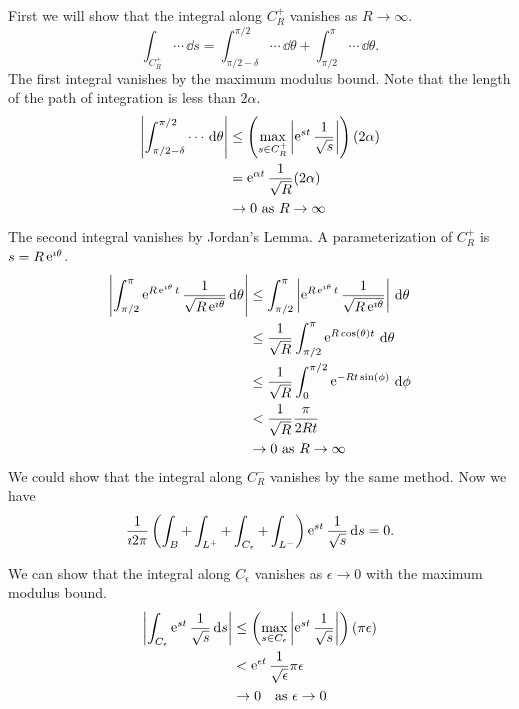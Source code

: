 \begin{Example}
  First we will show that the integral along
  $C_R^+$ vanishes as $R \to \infty$.
  \[
  \int_{C_R^+} \cdots \,\dd s = \int_{\pi/2-\delta}^{\pi/2} \cdots \,\dd \theta + \int_{\pi/2}^\pi \cdots \,\dd \theta.
  \]
  The first integral vanishes by the maximum modulus bound.  Note 
  that the length of the path of integration is less than $2 \alpha$.
  \begin{align*}
    \left| \int_{\pi/2-\delta}^{\pi/2} \cdots \,\mathrm{d} \theta \right|
    &\leq \left( \max_{s \in C_R^+} 
      \left| \mathop{\mathrm{e}}\nolimits^{s t} \frac{1}{\sqrt{s}} \right| \right) (2 \alpha) \\
    &= \mathop{\mathrm{e}}\nolimits^{\alpha t} \frac{1}{\sqrt{R}} (2 \alpha) \\
    &\to 0\ \mathrm{as}\ R \to \infty
  \end{align*}
  The second integral vanishes by Jordan's Lemma.
  A parameterization of $C_R^+$ is $s = R \mathop{\mathrm{e}}\nolimits^{\imath \theta}$.
  \begin{align*}
    \left| \int_{\pi/2}^{\pi} \mathop{\mathrm{e}}\nolimits^{R \mathop{\mathrm{e}}\nolimits^{\imath \theta} t} \frac{1}{\sqrt{R \mathop{\mathrm{e}}\nolimits^{\imath \theta}}} \,\mathrm{d} \theta \right|
    &\leq \int_{\pi/2}^{\pi} \left| \mathop{\mathrm{e}}\nolimits^{R \mathop{\mathrm{e}}\nolimits^{\imath \theta} t} \frac{1}{\sqrt{R \mathop{\mathrm{e}}\nolimits^{\imath \theta}}} \right| \,\mathrm{d} \theta \\
    &\leq \frac{1}{\sqrt{R}} \int_{\pi/2}^{\pi} \mathop{\mathrm{e}}\nolimits^{R \cos(\theta) t} \,\mathrm{d} \theta \\
    &\leq \frac{1}{\sqrt{R}} \int_0^{\pi/2} \mathop{\mathrm{e}}\nolimits^{- R t \sin(\phi)} \,\mathrm{d} \phi \\
    &< \frac{1}{\sqrt{R}} \frac{\pi}{2 R t} \\
    &\to 0\ \mathrm{as}\ R \to \infty
  \end{align*}
  We could show that the integral along $C_R^-$ vanishes by the same method.
  Now we have
  \[
  \frac{1}{\imath 2 \pi} \left( \int_B + \int_{L^+} + \int_{C_\epsilon} + \int_{L^-} \right)
  \mathop{\mathrm{e}}\nolimits^{s t} \frac{1}{\sqrt{s}}\,\mathrm{d} s = 0.
  \]



  We can show that the integral along $C_\epsilon$ vanishes as 
  $\epsilon \to 0$ with the maximum modulus bound.  
  \begin{align*} 
    \left| \int_{C_\epsilon} \mathop{\mathrm{e}}\nolimits^{s t} \frac{1}{\sqrt{s}} \,\mathrm{d} s \right|
    &\leq \left(\max_{s \in C_\epsilon} \left| \mathop{\mathrm{e}}\nolimits^{s t} \frac{1}{\sqrt{s}} 
      \right| \right) (\pi \epsilon) \\
    &< \mathop{\mathrm{e}}\nolimits^{\epsilon t} \frac{1}{\sqrt{\epsilon}} \pi \epsilon \\
    &\to 0 \quad \mathrm{as}\ \epsilon \to 0
  \end{align*}




\end{Example}
